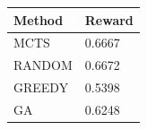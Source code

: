 \begin{tabular}{ll}
\hline
Method & Reward \\
\hline
  MCTS & 0.6667 \\
  RANDOM & 0.6672 \\
  GREEDY & 0.5398 \\
  GA & 0.6248 \\
\hline
\end{tabular}
